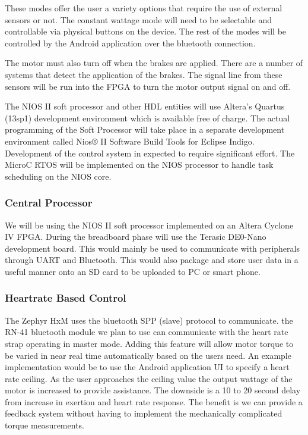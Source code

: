 \documentclass[12pt,article]{IEEEtran}
\begin{document}
    	These modes offer the user a variety options that require the use of external sensors or not. The constant
        wattage mode will need to be selectable and controllable via physical buttons on the device. The rest of the
        modes will be controlled by the Android application over the bluetooth connection.
        
    	The motor must also turn off when the brakes are applied. There are a number of systems that detect the application
        of the brakes. The signal line from these sensors will be run into the FPGA to turn the motor output signal on and off. 
        
    	The NIOS II soft processor and other HDL entities will use Altera's Quartus (13sp1) development
        environment which is available free of charge. The actual programming of the Soft Processor will take place in a separate 
		development environment called Nios® II Software Build Tools for Eclipse Indigo. Development of the control system in 
		expected to require significant effort. The MicroC RTOS will be implemented on the NIOS processor to handle task scheduling on the NIOS core. 

	\subsubsection{\bfseries Central Processor}
		We will be using the NIOS II soft processor implemented on an Altera Cyclone IV FPGA. During
		the breadboard phase will use the Terasic DE0-Nano development board. This would mainly be 
		used to communicate with peripherals through UART and Bluetooth. This would also package and 
		store user data in a useful manner onto an SD card to be uploaded to PC or smart phone.	
	
	\subsubsection{\bfseries Heartrate Based Control}
		The Zephyr HxM uses the bluetooth SPP (slave) protocol to communicate. the RN-41 bluetooth module 
		we plan to use can communicate with the heart rate strap operating  in master mode. Adding this feature 
		will allow motor torque to be varied in near real time automatically based on the users need. An example 
		implementation would be to use the Android application UI to specify a heart rate ceiling. As the user approaches 
		the ceiling value the output wattage of the motor is increased to provide assistance. The downside 
		is a 10 to 20 second delay from increase in exertion and heart rate response. The benefit is we can 
		provide a feedback system without having to implement the mechanically complicated torque measurements. \cite{HxMAPI}
		
\end{document}
